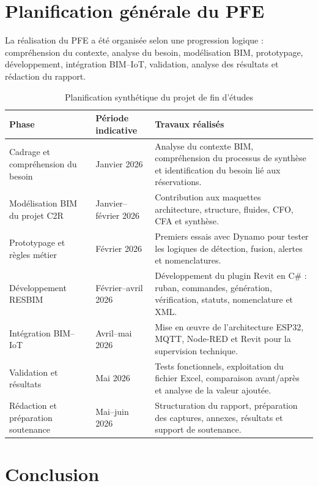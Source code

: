 \documentclass[12pt,a4paper]{report}
\begin{document}
\section{Planification générale du PFE}

La réalisation du PFE a été organisée selon une progression logique : compréhension du contexte, analyse du besoin, modélisation BIM, prototypage, développement, intégration BIM--IoT, validation, analyse des résultats et rédaction du rapport.

\begin{table}[H]
\centering
\caption{Planification synthétique du projet de fin d'études}
\begin{tabularx}{0.95\textwidth}{|L{3.5cm}|L{3.2cm}|Y|}
\hline
\textbf{Phase} & \textbf{Période indicative} & \textbf{Travaux réalisés} \\
\hline
Cadrage et compréhension du besoin & Janvier 2026 & Analyse du contexte BIM, compréhension du processus de synthèse et identification du besoin lié aux réservations. \\
\hline
Modélisation BIM du projet C2R & Janvier--février 2026 & Contribution aux maquettes architecture, structure, fluides, CFO, CFA et synthèse. \\
\hline
Prototypage et règles métier & Février 2026 & Premiers essais avec Dynamo pour tester les logiques de détection, fusion, alertes et nomenclatures. \\
\hline
Développement RESBIM & Février--avril 2026 & Développement du plugin Revit en C\# : ruban, commandes, génération, vérification, statuts, nomenclature et XML. \\
\hline
Intégration BIM--IoT & Avril--mai 2026 & Mise en œuvre de l'architecture ESP32, MQTT, Node-RED et Revit pour la supervision technique. \\
\hline
Validation et résultats & Mai 2026 & Tests fonctionnels, exploitation du fichier Excel, comparaison avant/après et analyse de la valeur ajoutée. \\
\hline
Rédaction et préparation soutenance & Mai--juin 2026 & Structuration du rapport, préparation des captures, annexes, résultats et support de soutenance. \\
\hline
\end{tabularx}
\end{table}

\section{Conclusion}
\end{document}

